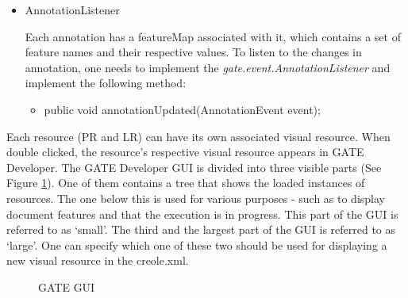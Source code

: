\begin{itemize}
\item{AnnotationListener}

	Each annotation has a featureMap associated with it, which contains a
	set of feature names and their respective values. To listen to the
	changes in annotation, one needs to implement the
	\textit{gate.event.AnnotationListener} and implement the following
	method:

	\begin{itemize}
	\item{public void annotationUpdated(AnnotationEvent event);}
	\end{itemize}

\end{itemize}



Each resource (PR and LR) can have its own associated visual
resource. When double clicked, the resource's respective visual
resource appears in GATE Developer.  The GATE Developer GUI is divided
into three visible parts (See Figure
\ref{fig:gateguiparts}). One of them contains a tree that shows the loaded
instances of resources. The one below this is used for various purposes - such
as to display document features and that the execution is in progress. This part
of the GUI is referred to as `small'. The third and the largest part of the GUI is
referred to as `large'. One can specify which one of these two should be used for
displaying a new visual resource in the creole.xml.

\begin{figure}
\caption{GATE GUI} 
\label{fig:gateguiparts}
\end{figure}

